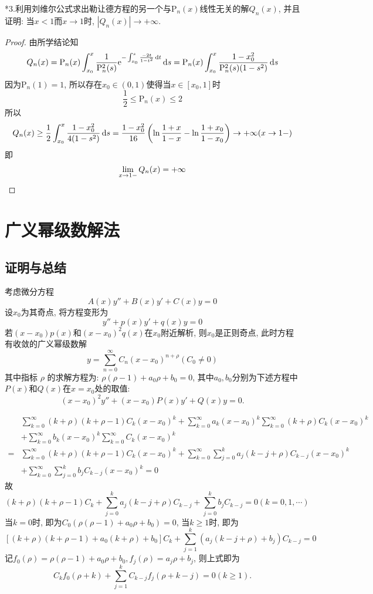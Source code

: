 *3.利用刘维尔公式求出勒让德方程的另一个与$\mathrm{P}_n(x)$线性无关的解$Q_n(x)$, 并且证明: 当$x<1$而$x\to1$时, $|Q_n(x)|\to+\infty$.
\begin{proof} 
由所学结论知
\[Q_n(x)=\mathrm{P}_n(x)\int_{x_0}^x\frac{1}{\mathrm{P}_n^2(s)}\mathrm{e}^{-\int_{x_0}^s\frac{-2t}{1-t^2}\,\mathrm{d} t}\,\mathrm{d} s=\mathrm{P}_n(x)\int_{x_0}^x\frac{1-x_0^2}{\mathrm{P}_n^2(s)(1-s^2)}\,\mathrm{d} s\]
因为$\mathrm{P}_n(1)=1$, 所以存在$x_0\in(0,1)$使得当$x\in[x_0,1]$时
\[\frac{1}{2}\leq\mathrm{P}_n(x)\leq2\]
所以\[Q_n(x)\geq\frac{1}{2}\int_{x_0}^x\frac{1-x_0^2}{4(1-s^2)}\,\mathrm{d} s=\frac{1-x_0^2}{16}\left(\ln\frac{1+x}{1-x}-\ln\frac{1+x_0}{1-x_0}\right)\to+\infty(x\to1-)\]
即\[\lim_{x\to1-}Q_n(x)=+\infty\qedhere\]
\end{proof}


\section{广义幂级数解法}


\subsection{证明与总结}


考虑微分方程\[A(x)y''+B(x)y'+C(x)y=0\]
设$x_0$为其奇点, 将方程变形为
\[y''+p(x)y'+q(x)y=0\]
若$(x-x_0)p(x)$和$(x-x_0)^2q(x)$在$x_0$附近解析, 则$x_0$是正则奇点, 此时方程有收敛的广义幂级数解
\[y=\sum_{n=0}^{\infty}C_n(x-x_0)^{n+\rho}(C_0\neq0)\]
其中指标 $\rho$ 的求解方程为: $\rho(\rho-1)+a_0\rho+b_0=0$, 其中$a_0,b_0$分别为下述方程中$P(x)$和$Q(x)$在$x=x_0$处的取值:
\[(x-x_0)^2y''+(x-x_0)P(x)y'+Q(x)y=0.\]

\[\begin{split}
&\sum_{k=0}^{\infty}(k+\rho)(k+\rho-1)C_k(x-x_0)^k+\sum_{k=0}^{\infty}a_k(x-x_0)^k\sum_{k=0}^{\infty}(k+\rho)C_k(x-x_0)^k\\
&+\sum_{k=0}^{\infty}b_k(x-x_0)^k\sum_{k=0}^{\infty}C_k(x-x_0)^k\\
=&\sum_{k=0}^{\infty}(k+\rho)(k+\rho-1)C_k(x-x_0)^k+\sum_{k=0}^{\infty}\sum_{j=0}^ka_j(k-j+\rho)C_{k-j}(x-x_0)^k\\
&+\sum_{k=0}^{\infty}\sum_{j=0}^kb_jC_{k-j}(x-x_0)^k=0
\end{split}\]
故\[(k+\rho)(k+\rho-1)C_k+\sum_{j=0}^ka_j(k-j+\rho)C_{k-j}+\sum_{j=0}^kb_jC_{k-j}=0(k=0,1,\cdots)\]
当$k=0$时, 即为$C_0(\rho(\rho-1)+a_0\rho+b_0)=0$, 当$k\geq1$时, 即为
\[\left[(k+\rho)(k+\rho-1)+a_0(k+\rho)+b_0\right]C_k+\sum_{j=1}^k\left(a_j(k-j+\rho)+b_j\right)C_{k-j}=0\]
记$f_0(\rho)=\rho(\rho-1)+a_0\rho+b_0, f_j(\rho)=a_j\rho+b_j$, 则上式即为
\[C_kf_0(\rho+k)+\sum_{j=1}^kC_{k-j}f_j(\rho+k-j)=0(k\geq1).\]


